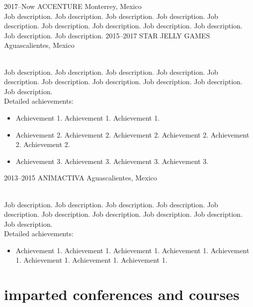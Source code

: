 \documentclass[]{cv-style}          %
\begin{document}
\begin{entrylist}
\entry
  {2017--Now}
  {ACCENTURE}
  {Monterrey, Mexico}
  {\\
  Job description. Job description. Job description. Job description. Job description. Job description. Job description. Job description. Job description. Job description. Job description.}
\entry
  {2015--2017}
  {STAR JELLY GAMES}
  {Aguascalientes, Mexico}
  {\\
  Job description. Job description. Job description. Job description. Job description. Job description. Job description. Job description. Job description. Job description.\\
  Detailed achievements:
  \begin{itemize}
    \item Achievement 1. Achievement 1. Achievement 1. 
    \item Achievement 2. Achievement 2. Achievement 2. Achievement 2. Achievement 2. Achievement 2.
    \item Achievement 3. Achievement 3. Achievement 3. Achievement 3.  
  \end{itemize}}
\entry
  {2013--2015}
  {ANIMACTIVA}
  {Aguascalientes, Mexico}
  {\\
  Job description. Job description. Job description. Job description. Job description. Job description. Job description. Job description. Job description. Job description.\\
  Detailed achievements:
  \begin{itemize}
    \item Achievement 1. Achievement 1. Achievement 1. Achievement 1. Achievement 1. Achievement 1. Achievement 1. Achievement 1. 
  \end{itemize}}

\end{entrylist}


\section{imparted conferences and courses}
\end{document}
